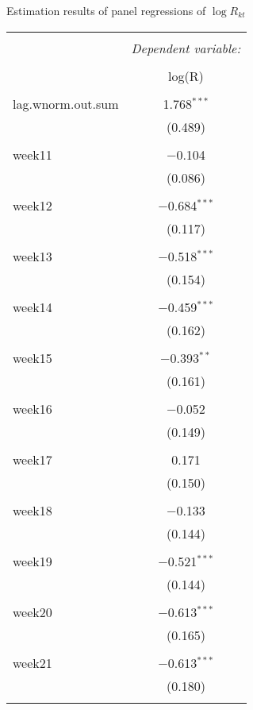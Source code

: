   \caption{Estimation results of panel regressions of $\log R_{kt}$} 
  \label{} 
\small 
\begin{tabular}{@{\extracolsep{5pt}}lc} 
\\[-1.8ex]\hline 
\hline \\[-1.8ex] 
 & \multicolumn{1}{c}{\textit{Dependent variable:}} \\ 
\cline{2-2} 
\\[-1.8ex] & log(R) \\ 
\hline \\[-1.8ex] 
 lag.wnorm.out.sum & 1.768$^{***}$ \\ 
  & (0.489) \\ 
  & \\ 
 week11 & $-$0.104 \\ 
  & (0.086) \\ 
  & \\ 
 week12 & $-$0.684$^{***}$ \\ 
  & (0.117) \\ 
  & \\ 
 week13 & $-$0.518$^{***}$ \\ 
  & (0.154) \\ 
  & \\ 
 week14 & $-$0.459$^{***}$ \\ 
  & (0.162) \\ 
  & \\ 
 week15 & $-$0.393$^{**}$ \\ 
  & (0.161) \\ 
  & \\ 
 week16 & $-$0.052 \\ 
  & (0.149) \\ 
  & \\ 
 week17 & 0.171 \\ 
  & (0.150) \\ 
  & \\ 
 week18 & $-$0.133 \\ 
  & (0.144) \\ 
  & \\ 
 week19 & $-$0.521$^{***}$ \\ 
  & (0.144) \\ 
  & \\ 
 week20 & $-$0.613$^{***}$ \\ 
  & (0.165) \\ 
  & \\ 
 week21 & $-$0.613$^{***}$ \\ 
  & (0.180) \\ 
  & \\ 

\end{tabular}
